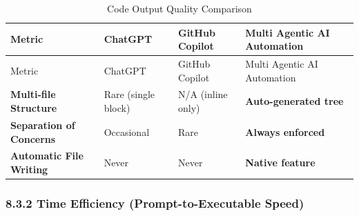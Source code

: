 \documentclass[
  12pt,
]{article}
\begin{document}
\begin{longtable}[]{@{}
  >{\raggedright\arraybackslash}p{}
  >{\raggedright\arraybackslash}p{}
  >{\raggedright\arraybackslash}p{}
  >{\raggedright\arraybackslash}p{}@{}}
\caption{Code Output Quality Comparison}\tabularnewline
\toprule\noalign{}
\begin{minipage}[b]{\linewidth}\raggedright
Metric
\end{minipage} & \begin{minipage}[b]{\linewidth}\raggedright
ChatGPT
\end{minipage} & \begin{minipage}[b]{\linewidth}\raggedright
GitHub Copilot
\end{minipage} & \begin{minipage}[b]{\linewidth}\raggedright
Multi Agentic AI Automation
\end{minipage} \\
\midrule\noalign{}
\endfirsthead
\toprule\noalign{}
\begin{minipage}[b]{\linewidth}\raggedright
Metric
\end{minipage} & \begin{minipage}[b]{\linewidth}\raggedright
ChatGPT
\end{minipage} & \begin{minipage}[b]{\linewidth}\raggedright
GitHub Copilot
\end{minipage} & \begin{minipage}[b]{\linewidth}\raggedright
Multi Agentic AI Automation
\end{minipage} \\
\midrule\noalign{}
\endhead
\bottomrule\noalign{}
\endlastfoot
\textbf{Multi-file Structure} & Rare (single block) & N/A (inline only)
& \textbf{Auto-generated tree} \\
\textbf{Separation of Concerns} & Occasional & Rare & \textbf{Always
enforced} \\
\textbf{Automatic File Writing} & Never & Never & \textbf{Native
feature} \\
\end{longtable}

\subsubsection{8.3.2 Time Efficiency (Prompt-to-Executable
Speed)}\label{time-efficiency-prompt-to-executable-speed}
\end{document}
